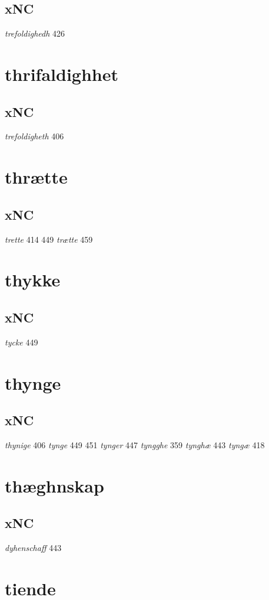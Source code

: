 \documentclass[a4paper,twocolumn]{article}
\begin{document}
\subsection{xNC}
\label{sec:org5c0804a}
\emph{trefoldighedh} 426 
\section{thrifaldighhet}
\label{sec:orga0d7cde}
\subsection{xNC}
\label{sec:orgff66ef6}
\emph{trefoldigheth} 406 
\section{thrætte}
\label{sec:orgf7309ba}
\subsection{xNC}
\label{sec:org0451edb}
\emph{trette} 414 449 \emph{trætte} 459 
\section{thykke}
\label{sec:org1ca5ade}
\subsection{xNC}
\label{sec:orgc29c8a8}
\emph{tycke} 449 
\section{thynge}
\label{sec:org862ecb8}
\subsection{xNC}
\label{sec:org6052094}
\emph{thynige} 406 \emph{tynge} 449 451 \emph{tynger} 447 \emph{tyngghe} 359 \emph{tynghæ} 443 \emph{tyngæ} 418 
\section{thæghnskap}
\label{sec:org95ede2c}
\subsection{xNC}
\label{sec:orgf3b381f}
\emph{dyhenschaff} 443 
\section{tiende}
\label{sec:orga7056f1}
\end{document}
